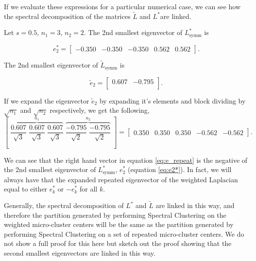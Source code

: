 If we evaluate these expressions for a particular numerical case, we can see how the spectral decomposition of the matrices $\tilde{L}$ and $L^* $are linked.

Let $s = 0.5$, $n_1 = 3$, $n_2 = 2$. The 2nd smallest eigenvector of $L^*_{\text{symm}}$ is 

\begin{equation}
  \label{eq:e2*}
   e_2^* = \left[ 
\begin{array}{ccccc}
  -0.350& -0.350& -0.350& 0.562& 0.562  
\end{array} \right].
\end{equation}

The 2nd smallest eigenvector of $\tilde{L}_{\text{symm}}$ is 

\begin{equation}
  \label{eq:e2}
   \tilde{e}_2 = \left[ 
\begin{array}{cc}
  0.607 & -0.795 \\
\end{array} \right] .
\end{equation}

If we expand the eigenvector $\tilde{e}_2$ by expanding it's elements and block dividing by $\sqrt{n_1}$ and $\sqrt{n_2}$ respectively, we get the following, 
\begin{equation}
  \label{eq:e_repeat}
   \left[ \; \overbrace{\frac{0.607}{\sqrt{3}} \; \frac{0.607}{\sqrt{3}} \; \frac{0.607}{\sqrt{3}}}^{n_1} \; \overbrace{\frac{-0.795}{\sqrt{2}} \; \frac{-0.795}{\sqrt{2}}}^{n_2} \; \right] 
=  \left[ 
\begin{array}{ccccc}
0.350& 0.350& 0.350 & -0.562& -0.562  
\end{array} \right] .
\end{equation}

We can see that the right hand vector in equation \eqref{eq:e_repeat} is the negative of the 2nd smallest eigenvector of $L^*_{\text{symm}}$, $e_2^* $ (equation \eqref{eq:e2*}). 
In fact, we will always have that the expanded repeated eigenvector of the weighted Laplacian equal to either $e_k^*$ or $-e_k^*$ for all $k$.

Generally, the spectral decomposition of $L^*$ and $\tilde{L}$ are linked in this way, and therefore the partition generated by performing Spectral Clustering on the weighted micro-cluster centers will be the same as the partition generated by performing Spectral Clustering on a set of repeated micro-cluster centers. We do not show a full proof for this here but sketch out the proof showing that the second smallest eigenvectors are linked in this way. 

